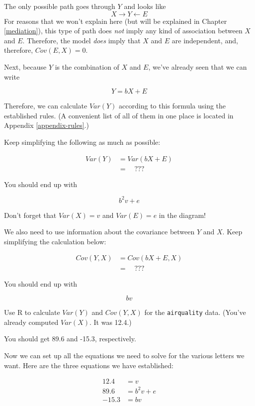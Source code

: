 \documentclass[
]{book}
\begin{document}
The only possible path goes through \(Y\) and looks like
\[
X \boldsymbol{\rightarrow} Y \leftarrow E
\]
For reasons that we won't explain here (but will be explained in Chapter \ref{mediation}), this type of path does \emph{not} imply any kind of association between \(X\) and \(E\). Therefore, the model \emph{does} imply that \(X\) and \(E\) are independent, and, therefore, \(Cov(E, X) = 0\).

Next, because \(Y\) is the combination of \(X\) and \(E\), we've already seen that we can write

\[
Y = bX + E
\]

Therefore, we can calculate \(Var(Y)\) according to this formula using the established rules. (A convenient list of all of them in one place is located in Appendix \ref{appendix-rules}.)

Keep simplifying the following as much as possible:

\begin{align}
Var(Y)  &= Var(bX + E) \\
        &= \quad ???
\end{align}

You should end up with

\[
b^{2}v + e
\]

Don't forget that \(Var(X) = v\) and \(Var(E) = e\) in the diagram!

We also need to use information about the covariance between \(Y\) and \(X\). Keep simplifying the calculation below:

\begin{align}
Cov(Y, X)  &= Cov(bX + E, X) \\
        &= \quad ???
\end{align}

You should end up with

\[
bv
\]

Use R to calculate \(Var(Y)\) and \(Cov(Y, X)\) for the \texttt{airquality} data. (You've already computed \(Var(X)\). It was 12.4.)

You should get 89.6 and -15.3, respectively.

Now we can set up all the equations we need to solve for the various letters we want. Here are the three equations we have established:

\begin{align}
12.4 &= v \\
89.6 &= b^2v + e \\
-15.3 &= bv
\end{align}
\end{document}
